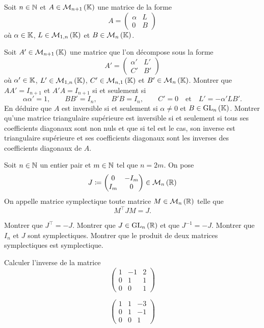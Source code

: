 \documentclass{magnolia}
\begin{document}
Soit $n\in\mathbb{N}$ et $A\in\mathcal{M}_{n+1}\left(\mathbb{K}\right)$ une matrice de la forme
\[A=\begin{pmatrix}
  \alpha & L\\
  0      & B
  \end{pmatrix}\]
où $\alpha\in\mathbb{K}$, $L\in\mathcal{M}_{1,n}\left(\mathbb{K}\right)$ et $B\in\mathcal{M}_{n}\left(\mathbb{K}\right)$.
\begin{questions}
\question Soit $A'\in\mathcal{M}_{n+1}\left(\mathbb{K}\right)$ une matrice que l'on décompose sous la forme
  \[A'=\begin{pmatrix}
    \alpha' & L'\\
    C'       & B'
    \end{pmatrix}\]
  où $\alpha'\in\mathbb{K}$, $L'\in\mathcal{M}_{1,n}\left(\mathbb{K}\right)$, $C'\in\mathcal{M}_{n,1}\left(\mathbb{K}\right)$ et $B'\in\mathcal{M}_{n}\left(\mathbb{K}\right)$.
  Montrer que $AA'=I_{n+1}$ et $A'A=I_{n+1}$ si et seulement si
  \[\alpha\alpha'=1, \qquad BB'=I_n, \qquad B'B=I_n, \qquad C'=0\quad\text{et}\quad L'=-\alpha' L B'.\]
\question En déduire que $A$ est inversible si et seulement si $\alpha\neq 0$ et $B\in{\rm GL}_{n}\left(\mathbb{K}\right)$.
\question Montrer qu'une matrice triangulaire supérieure est inversible si et seulement si tous ses
  coefficients diagonaux sont non nuls et que si tel est le cas, son inverse est triangulaire
  supérieure et ses coefficients diagonaux sont les inverses des coefficients diagonaux de $A$.
\end{questions}

Soit $n\in\mathbb{N}$ un entier pair et $m\in\mathbb{N}$ tel que $n=2m$. On pose
\[J\coloneqq\begin{pmatrix}
  0   & -I_m\\
  I_m & 0 \end{pmatrix}\in\mathcal{M}_{n}\left(\mathbb{R}\right)\]
On appelle matrice symplectique toute matrice $M\in\mathcal{M}_{n}\left(\mathbb{R}\right)$ telle que
\[M^\top J M =J.\]
\begin{questions}
\question Montrer que $J^\top=-J$.
\question Montrer que $J\in{\rm GL}_{n}\left(\mathbb{R}\right)$ et que $J^{-1}=-J$.
\question Montrer que $I_n$ et $J$ sont symplectiques.
\question Montrer que le produit de deux matrices symplectiques est symplectique.
\end{questions}


Calculer l'inverse de la matrice
  \[\begin{pmatrix}
    1 & -1 & 2\\
    0 & 1 & 1\\
    0 & 0 & 1
    \end{pmatrix}\]
\begin{sol}
\[\begin{pmatrix}
  1 & 1 & -3\\
  0 & 1 & -1\\
  0 & 0 & 1
  \end{pmatrix}\]
\end{sol}
\end{document}

